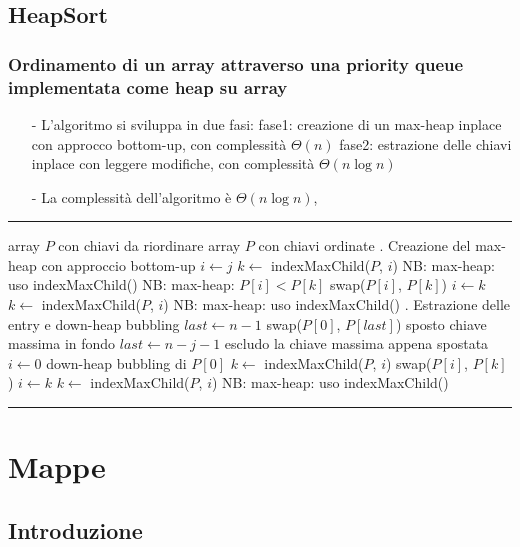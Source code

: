\documentclass[a4paper]{article}
\makeatletter
\newenvironment{algo}[4]{
	\noindent\rule{\textwidth}{0.4pt}
	\begin{algorithmic}[1]
		\addtocounter{ALG@line}{-1}
		\Procedure{#1}{#2}
		\Require #3
		\Ensure #4
		\Statex }{
		\EndProcedure
	\end{algorithmic}
	\rule{\textwidth}{0.4pt}}
\makeatother
\begin{document}
\subsection{HeapSort}
\subsubsection*{Ordinamento di un array attraverso una priority queue implementata come heap su array}
\begin{itemize}[topsep=3pt, itemsep=0pt]
	\item[-] L'algoritmo si sviluppa in due fasi:
	\subitem fase1: creazione di un max-heap inplace con approcco bottom-up, con complessità \(\Theta(n)\)
	\subitem fase2: estrazione delle chiavi inplace con leggere modifiche, con complessità \(\Theta(n \log n)\)
	\item[-] La complessità dell'algoritmo è \(\Theta(n \log n)\),
\end{itemize}
\begin{algo}{heapSort}{$P$}{array $P$ con chiavi da riordinare}{array $P$ con chiavi ordinate}
	. Creazione del max-heap con approccio bottom-up
		\State $i \gets j$
		\State $k \gets$ indexMaxChild($P$, $i$) \Comment NB: max-heap: uso indexMaxChild()
		 \Comment NB: max-heap: $P[i] < P[k]$
			\State swap($P[i]$, $P[k]$)
			\State $i \gets k$
			\State $k \gets$ indexMaxChild($P$, $i$) \Comment NB: max-heap: uso indexMaxChild()
		\EndWhile
	\EndFor
	. Estrazione delle entry e down-heap bubbling
	\State $last \gets n-1$
		\State swap($P[0]$, $P[last]$) \Comment sposto chiave massima in fondo
		\State $last \gets n-j-1$ \Comment escludo la chiave massima appena spostata
		\State $i \gets 0$ \Comment down-heap bubbling di $P[0]$
		\State $k \gets$ indexMaxChild($P$, $i$)
			\State swap($P[i]$, $P[k]$)
			\State $i \gets k$
			\State $k \gets$ indexMaxChild($P$, $i$) \Comment NB: max-heap: uso indexMaxChild()
		\EndWhile
	\EndFor
\end{algo}

\newpage

\section{Mappe}
\subsection{Introduzione}
\end{document}
